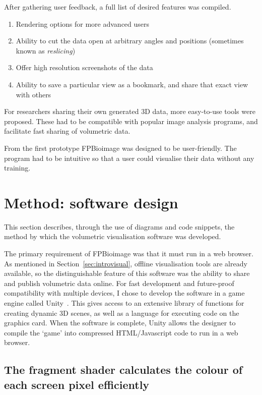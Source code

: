 After gathering user feedback, a full list of desired features was compiled. 

\begin{enumerate}
	\item Rendering options for more advanced users
	\item Ability to cut the data open at arbitrary angles and positions (sometimes known as \textit{reslicing})
	\item Offer high resolution screenshots of the data
	\item Ability to save a particular view as a bookmark, and share that exact view with others
\end{enumerate}

For researchers sharing their own generated 3D data, more easy-to-use tools were proposed. 
These had to be compatible with popular image analysis programs, and facilitate fast sharing of volumetric data. 

From the first prototype FPBioimage was designed to be user-friendly. 
The program had to be intuitive so that a user could visualise their data without any training. 

\section{Method: software design} \label{sec:fpbSoftwareDesign}
This section describes, through the use of diagrams and code snippets, the method by which the volumetric visualisation software was developed.

The primary requirement of FPBioimage was that it must run in a web browser.
As mentioned in Section~\ref{sec:introvisual}, offline visualisation tools are already available, so the distinguishable feature of this software was the ability to share and publish volumetric data online.
For fast development and future-proof compatibility with multiple devices, I chose to develop the software in a game engine called Unity~\cite{unity}.
This gives access to an extensive library of functions for creating dynamic 3D scenes, as well as a language for executing code on the graphics card.
When the software is complete, Unity allows the designer to compile the `game' into compressed HTML/Javascript code to run in a web browser.

\subsection{The fragment shader calculates the colour of each screen pixel efficiently} \label{sec:shader}

